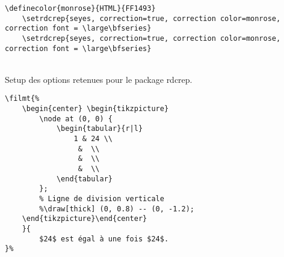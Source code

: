 \begin{tcolorbox}[colback=yellow!10!white, title=Exemple d'utilisation pour \texttt{setrdcrep}]
\begin{minipage}{0.45\textwidth}
\begin{lstlisting}[breaklines]
    \definecolor{monrose}{HTML}{FF1493}
    \setrdcrep{seyes, correction=true, correction color=monrose, correction font = \large\bfseries}
    \setrdcrep{seyes, correction=true, correction color=monrose, correction font = \large\bfseries}
\end{lstlisting}
\end{minipage}
\hfill
\begin{minipage}{0.45\textwidth}
\phantom{a}\\
Setup des options retenues pour le package rdcrep.
\end{minipage}
\end{tcolorbox}

\begin{tcolorbox}[colback=yellow!10!white, title=Exemple d'utilisation pour \texttt{filmt}]
\begin{minipage}{0.45\textwidth}
\begin{lstlisting}[breaklines]
\filmt{%
	\begin{center} \begin{tikzpicture}
        \node at (0, 0) {
            \begin{tabular}{r|l}
                1 & 24 \\
                 &  \\
                 &  \\
                 &  \\
            \end{tabular}
        };
        % Ligne de division verticale
        %\draw[thick] (0, 0.8) -- (0, -1.2);
    \end{tikzpicture}\end{center}
	}{
        $24$ est égal à une fois $24$.
}%
\end{lstlisting}
\end{minipage}
\hfill
\begin{minipage}{0.45\textwidth}
\phantom{a}\\
%
\end{minipage}
\end{tcolorbox}
